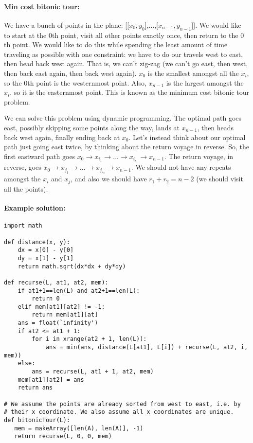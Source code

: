 \documentclass[11pt]{article}
\begin{document}
\paragraph{Min cost bitonic tour:}
We have a bunch of points in the plane:
[[$x_0,y_0$],$\ldots$,[$x_{n-1},y_{n-1}$]].  We would like to start at
the $0$th point, visit all other points exactly once, then return to
the $0$th point.  We would like to do this while spending the least
amount of time traveling as possible with one constraint: we have to
do our travels west to east, then head back west again.  That is, we
can't zig-zag (we can't go east, then west, then back east again, then
back west again).  $x_0$ is the smallest amongst all the $x_i$, so the
$0$th point is the westernmost point.  Also, $x_{n-1}$ is the largest
amongst the $x_i$, so it is the easternmost point.  This is known as
the minimum cost bitonic tour problem.

We can solve this problem using dynamic programming.  The optimal path
goes east, possibly skipping some points along
the way, lands at $x_{n-1}$, then heads back west again, finally
ending back at $x_0$.  Let's instead think about our optimal path just
going east twice, by thinking about the return voyage in reverse.  So,
the first eastward path goes $x_0\rightarrow x_{i_1} \rightarrow
 \ldots \rightarrow x_{i_{r_1}} \rightarrow x_{n-1}$.  The return voyage,
in reverse, goes $x_0\rightarrow x_{j_1}\rightarrow \ldots \rightarrow
x_{j_{r_2}} \rightarrow x_{n-1}$.  We should not have any repeats
amongst the $x_i$ and $x_j$, and also we should have $r_1 + r_2 = n-2$
(we should visit all the points).

\paragraph{Example solution:}
\begin{verbatim}
import math

def distance(x, y):
    dx = x[0] - y[0]
    dy = x[1] - y[1]
    return math.sqrt(dx*dx + dy*dy)

def recurse(L, at1, at2, mem):
    if at1+1==len(L) and at2+1==len(L):
        return 0
    elif mem[at1][at2] != -1:
        return mem[at1][at]
    ans = float(`infinity')
    if at2 <= at1 + 1:
        for i in xrange(at2 + 1, len(L)):
            ans = min(ans, distance(L[at1], L[i]) + recurse(L, at2, i, mem))
    else:
        ans = recurse(L, at1 + 1, at2, mem)
    mem[at1][at2] = ans
    return ans
    
# We assume the points are already sorted from west to east, i.e. by
# their x coordinate. We also assume all x coordinates are unique.
def bitonicTour(L):
   mem = makeArray([len(A), len(A)], -1)
   return recurse(L, 0, 0, mem)
\end{verbatim}
\end{document}
